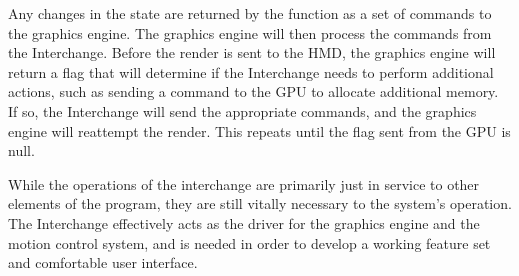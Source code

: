 \documentclass[onecolumn, draftclsnofoot,10pt, compsoc]{IEEEtran}
\begin{document}
Any changes in the state are returned by the function as a set of commands to the graphics engine. The graphics engine will then process the commands from the Interchange. Before the render is sent to the HMD, the graphics engine will return a flag that will determine if the Interchange needs to perform additional actions, such as sending a command to the GPU to allocate additional memory. If so, the Interchange will send the appropriate commands, and the graphics engine will reattempt the render. This repeats until the flag sent from the GPU is null. 

While the operations of the interchange are primarily just in service to other elements of the program, they are still vitally necessary to the system’s operation. The Interchange effectively acts as the driver for the graphics engine and the motion control system, and is needed in order to develop a working feature set and comfortable user interface.

\cite{vive}\cite{tilt}\cite{cave}\cite{unreal}\cite{unity}
\end{document}
